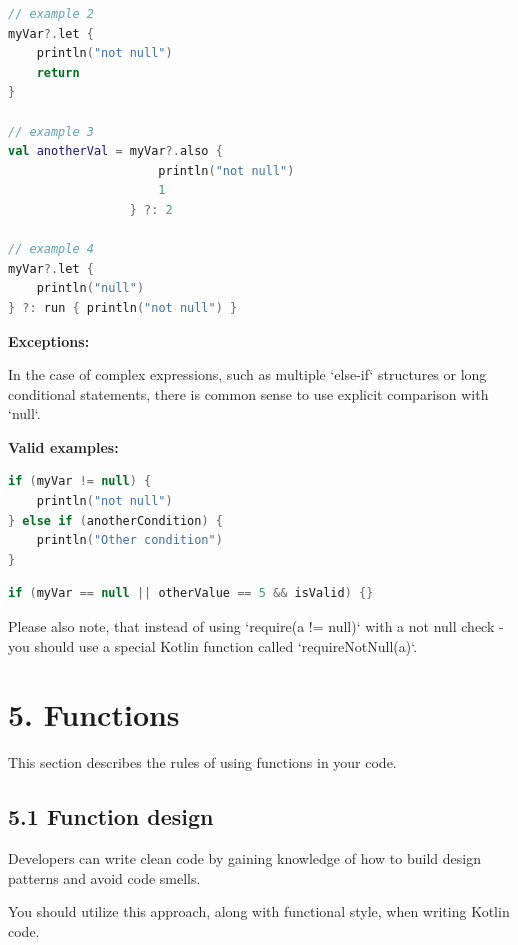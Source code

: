 {{{{\begin{lstlisting}[language=Kotlin]
// example 2
myVar?.let {
    println("not null")
    return
}

// example 3
val anotherVal = myVar?.also {
                     println("not null")
                     1
                 } ?: 2

// example 4
myVar?.let {
    println("null")
} ?: run { println("not null") }
\end{lstlisting}


\textbf{Exceptions:}



In the case of complex expressions, such as multiple `else-if` structures or long conditional statements, there is common sense to use explicit comparison with `null`.



\textbf{Valid examples:}



\begin{lstlisting}[language=Kotlin]
if (myVar != null) {
    println("not null")
} else if (anotherCondition) {
    println("Other condition")
}
\end{lstlisting}


\begin{lstlisting}[language=Kotlin]
if (myVar == null || otherValue == 5 && isValid) {}
\end{lstlisting}


Please also note, that instead of using `require(a != null)` with a not null check - you should use a special Kotlin function called `requireNotNull(a)`.



\section*{\textbf{5. Functions}}

\label{sec:5.}

This section describes the rules of using functions in your code.

\subsection*{\textbf{5.1 Function design}}

\label{sec:5.1}

Developers can write clean code by gaining knowledge of how to build design patterns and avoid code smells.

You should utilize this approach, along with functional style, when writing Kotlin code. 

}}}}
